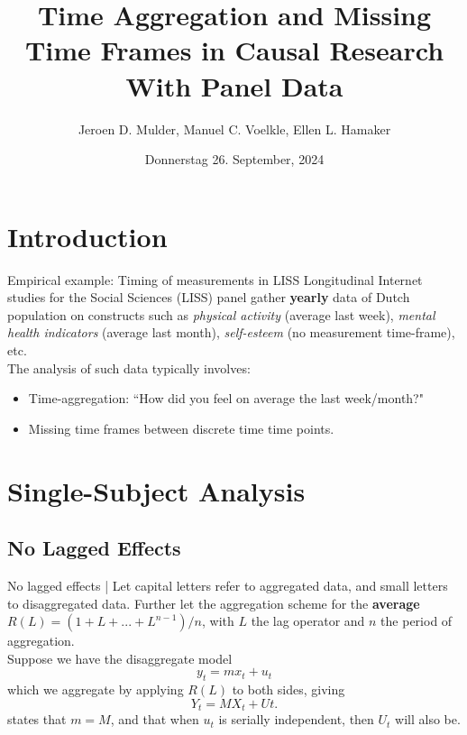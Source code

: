 \documentclass[aspectratio=169, xcolor=dvipsnames]{beamer} %
\title[]{Time Aggregation and Missing Time Frames in Causal Research With Panel Data}
\author[]{Jeroen D. Mulder\inst{1}, Manuel C. Voelkle\inst{2}, Ellen L. Hamaker\inst{1}}
\institute[]{
    \inst{1} Universiteit Utrecht\\
    \inst{2} Humboldt-Universität
}
\date{Donnerstag 26. September, 2024}
\begin{document}
\begin{frame}
    \titlepage %
\end{frame}

\section{Introduction}

\begin{frame}{Empirical example: Timing of measurements in LISS}
    Longitudinal Internet studies for the Social Sciences (LISS) panel gather \textbf{yearly} data of Dutch population on constructs such as \textit{physical activity} (average last week), \textit{mental health indicators} (average last month), \textit{self-esteem} (no measurement time-frame), etc.\\
    \bigskip
    \bigskip
    The analysis of such data typically involves:\\
    \bigskip
    \begin{itemize}
        \item Time-aggregation: ``How did you feel on average the last week/month?"\\
        \bigskip
        \item Missing time frames between discrete time time points. 
    \end{itemize}
\end{frame}

\section{Single-Subject Analysis}

\subsection{No Lagged Effects}

\begin{frame}{No lagged effects | \textcite{hickman_effects_1972}}
    Let capital letters refer to aggregated data, and small letters to disaggregated data. Further let the aggregation scheme for the \textbf{average} $R(L) = (1 + L + ... + L^{n - 1}) / n$, with $L$ the lag operator and $n$ the period of aggregation.\\
    \bigskip \pause
    Suppose we have the disaggregate model 
    \begin{equation} \label{eq:disaggregate-no-lagged}
        y_{t} = m x_{t} + u_{t}
    \end{equation}
    which we aggregate by applying $R(L)$ to both sides, giving
    \begin{equation} \label{eq:aggregate-no-lagged}
        Y_{t} = M X_{t} + U{t}. 
    \end{equation}
    \textcite{hickman_effects_1972} states that $m = M$, and that when $u_{t}$ is serially independent, then $U_{t}$ will also be. 
\end{frame} 
\end{document}
